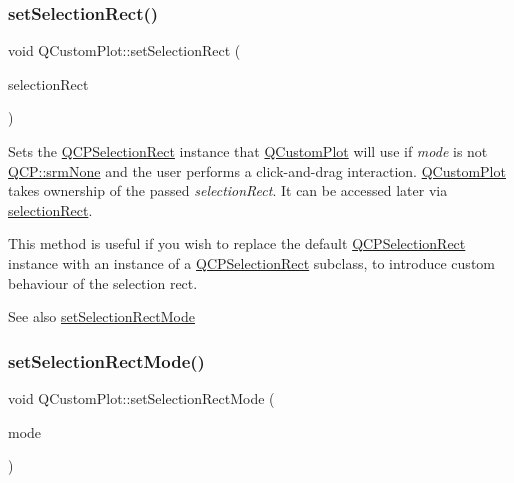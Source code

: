 \subsubsection{\texorpdfstring{set\+Selection\+Rect()}{setSelectionRect()}}
{\footnotesize\ttfamily void Q\+Custom\+Plot\+::set\+Selection\+Rect (\begin{DoxyParamCaption}\item[{\mbox{\hyperlink{class_q_c_p_selection_rect}{Q\+C\+P\+Selection\+Rect}} $\ast$}]{selection\+Rect }\end{DoxyParamCaption})}

Sets the \mbox{\hyperlink{class_q_c_p_selection_rect}{Q\+C\+P\+Selection\+Rect}} instance that \mbox{\hyperlink{class_q_custom_plot}{Q\+Custom\+Plot}} will use if {\itshape mode} is not \mbox{\hyperlink{namespace_q_c_p_ac9aa4d6d81ac76b094f9af9ad2d3aacfa9032f170490d67240a6c68c2638ffab1}{Q\+C\+P\+::srm\+None}} and the user performs a click-\/and-\/drag interaction. \mbox{\hyperlink{class_q_custom_plot}{Q\+Custom\+Plot}} takes ownership of the passed {\itshape selection\+Rect}. It can be accessed later via \mbox{\hyperlink{class_q_custom_plot_ad7df2bcbba307e644db383b449e31efd}{selection\+Rect}}.

This method is useful if you wish to replace the default \mbox{\hyperlink{class_q_c_p_selection_rect}{Q\+C\+P\+Selection\+Rect}} instance with an instance of a \mbox{\hyperlink{class_q_c_p_selection_rect}{Q\+C\+P\+Selection\+Rect}} subclass, to introduce custom behaviour of the selection rect.

\begin{DoxySeeAlso}{See also}
\mbox{\hyperlink{class_q_custom_plot_a810ef958ebe84db661c7288b526c0deb}{set\+Selection\+Rect\+Mode}} 
\end{DoxySeeAlso}
\mbox{\label{class_q_custom_plot_a810ef958ebe84db661c7288b526c0deb}} 
\subsubsection{\texorpdfstring{set\+Selection\+Rect\+Mode()}{setSelectionRectMode()}}
{\footnotesize\ttfamily void Q\+Custom\+Plot\+::set\+Selection\+Rect\+Mode (\begin{DoxyParamCaption}\item[{\mbox{\hyperlink{namespace_q_c_p_ac9aa4d6d81ac76b094f9af9ad2d3aacf}{Q\+C\+P\+::\+Selection\+Rect\+Mode}}}]{mode }\end{DoxyParamCaption})}

